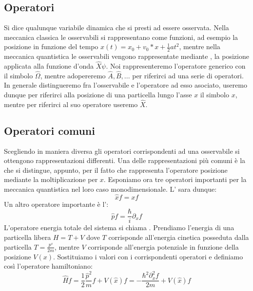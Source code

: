 \subsection{Operatori}
Si dice  qualunque variabile dinamica che si presti ad essere osservata. Nella meccanica classica le osservabili si rappresentano come funzioni, ad esempio la posizione in funzione del tempo $x(t) = x_0 + v_0 * x + \frac{1}{2} a t^2$, mentre nella meccanica quantistica le osservabili vengono rappresentate mediante , la posizione applicata alla funzione d'onda $\hat{X}\psi$. Noi rappresenteremo l'operatore generico con il simbolo $\hat{\Omega}$, mentre adopereremo $\hat{A}, \hat{B}, ...$ per riferirci ad una serie di operatori. In generale distingueremo fra l'osservabile e l'operatore ad esso asociato, useremo dunque per riferirci alla posizione di una particella lungo l'asse $x$ il simbolo $x$, mentre per riferirci al suo operatore useremo $\hat{X}$.

\subsection{Operatori comuni}
Scegliendo in maniera diversa gli operatori corrispondenti ad una osservabile si ottengono rappresentazioni differenti. Una delle rappresentazioni più comuni è la  che si distingue, appunto, per il fatto che rappresenta l'operatore posizione mediante la moltiplicazione per $x$. Esponiamo ora tre operatori importanti per la meccanica quantistica nel loro caso monodimensionale. L' sara dunque:
$$\hat{x} f = x f$$
Un altro operatore importante è l':
$$\hat{p} f = \frac{\hbar}{i} \partial_x f$$
L'operatore energia totale del sistema si chiama . Prendiamo l'energia di una particella libera $H = T + V$ dove $T$ corrisponde all'energia cinetica posseduta dalla particella $T = \frac{p^s}{2 m}$, mentre $V$ corrisponde all'energia potenziale in funzione della posizione $V(x)$. Sostituiamo i valori con i corrispondenti operatori e definiamo così l'operatore hamiltoniano:
$$\hat{H} f = \frac{1}{2}\frac{\hat{p}^2}{m} f + V(\hat{x}) f = -\frac{\hbar^2 \partial_x^2 f}{2 m} + V(\hat{x}) f$$


